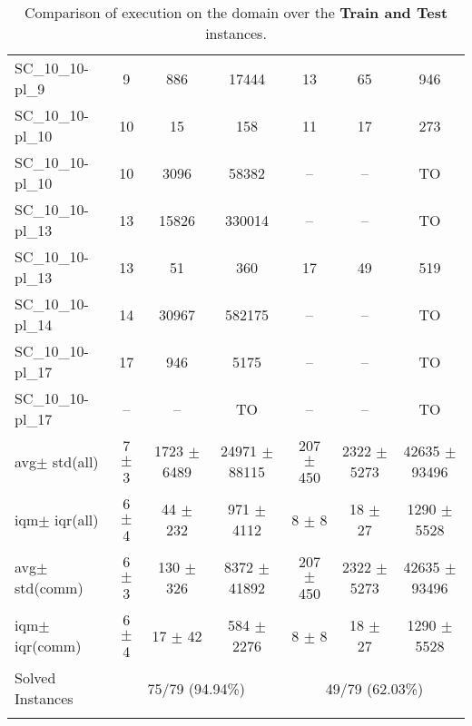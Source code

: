 \documentclass{article}
\newcommand{\unsolvedColumn}{--}
\newcommand{\myTO}{TO}
\newcommand{\myAvg}{avg}
\newcommand{\myStd}{std}
\newcommand{\IQM}{iqm}
\newcommand{\IQR}{iqr}
\newcommand{\allInstances}{all}
\newcommand{\onlyInCommon}{comm}
\begin{document}
\begin{longtable}[!ht]{l|ccc|ccc}
SC\_10\_10-pl\_9 & 9 & 886 & 17444 & 13 & 65 & 946 \\
SC\_10\_10-pl\_10 & 10 & 15 & 158 & 11 & 17 & 273 \\
SC\_10\_10-pl\_10 & 10 & 3096 & 58382 & \unsolvedColumn & \unsolvedColumn & \myTO \\
SC\_10\_10-pl\_13 & 13 & 15826 & 330014 & \unsolvedColumn & \unsolvedColumn & \myTO \\
SC\_10\_10-pl\_13 & 13 & 51 & 360 & 17 & 49 & 519 \\
SC\_10\_10-pl\_14 & 14 & 30967 & 582175 & \unsolvedColumn & \unsolvedColumn & \myTO \\
SC\_10\_10-pl\_17 & 17 & 946 & 5175 & \unsolvedColumn & \unsolvedColumn & \myTO \\
SC\_10\_10-pl\_17 & \unsolvedColumn & \unsolvedColumn & \myTO & \unsolvedColumn & \unsolvedColumn & \myTO \\
\hline
\myAvg  $\pm$ \myStd \hfill (\allInstances) & 7 $\pm$ 3 & 1723 $\pm$ 6489 & 24971 $\pm$ 88115 & 207 $\pm$ 450 & 2322 $\pm$ 5273 & 42635 $\pm$ 93496 \\
\IQM $\pm$ \IQR \hfill (\allInstances) & 6 $\pm$ 4 & 44 $\pm$ 232 & 971 $\pm$ 4112 & 8 $\pm$ 8 & 18 $\pm$ 27 & 1290 $\pm$ 5528 \\
\myAvg  $\pm$ \myStd \hfill (\onlyInCommon) & 6 $\pm$ 3 & 130 $\pm$ 326 & 8372 $\pm$ 41892 & 207 $\pm$ 450 & 2322 $\pm$ 5273 & 42635 $\pm$ 93496 \\
\IQM $\pm$ \IQR \hfill (\onlyInCommon) & 6 $\pm$ 4 & 17 $\pm$ 42 & 584 $\pm$ 2276 & 8 $\pm$ 8 & 18 $\pm$ 27 & 1290 $\pm$ 5528 \\
Solved Instances & \multicolumn{3}{c|}{75/79 (94.94\%)} & \multicolumn{3}{c}{49/79 (62.03\%)}
\\
\caption{Comparison of execution on the {} domain over the \textbf{Train and Test} instances.}
\label{tab:{final_reports}_{}_comparison_train_and_test}
\end{longtable}
\end{document}

